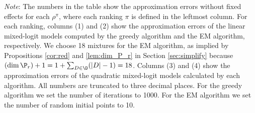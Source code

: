 \begin{table}[ht]
\begin{center}
  \caption{Approximation errors to  $\rho^{\pi}$}\label{tbl:apx_error1}
\end{center}
\begin{scriptsize}
\textit{Note}: The numbers in the table show the approximation errors without fixed effects for each $\rho^{\pi}$, where each ranking $\pi$ is defined in the leftmost column. For each ranking, columns (1) and (2) show the approximation errors of the linear mixed-logit models computed by the greedy algorithm and the EM algorithm, respectively. We choose 18 mixtures for the EM algorithm, as implied by Propositions \ref{cor:red} and  \ref{lem:dim_P_r} in Section \ref{sec:simplify} because $(\dim \P_r)+1=1+\sum_{D \in \D}(|D|-1)=18$. Columns (3) and (4) show the approximation errors of the quadratic mixed-logit models calculated by each algorithm. All numbers are truncated to three decimal places. For the greedy algorithm we set the number of iterations to 1000. For the EM algorithm we set the number of random initial points to 10. 
\end{scriptsize}
\end{table}
